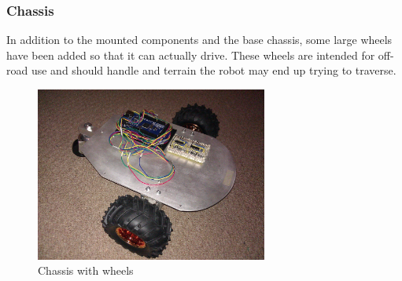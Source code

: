 \documentclass[11pt,fleqn,twoside]{article}
\begin{document}
\subsubsection{Chassis}
In addition to the mounted components and the base chassis, some large wheels have been added so that it can actually drive.  These wheels are intended for off-road use and should handle and terrain the robot may end up trying to traverse.
\begin{figure}[h]
\centering
        \includegraphics[width=3.0in] {figures/tria-mkII.jpg}
        \caption{Chassis with wheels}
        \label{Chassis with wheels}
\end{figure}
\end{document}
